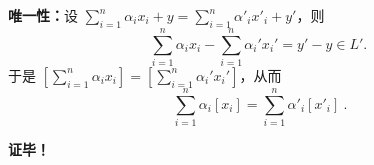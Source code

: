 \textbf{唯一性：}设 $\sum\limits_{i=1}^n\alpha_i x_i+y=\sum\limits_{i=1}^n\alpha'_i x'_i+y'$，则
\begin{equation}
\sum_{i=1}^n\alpha_i x_i-\sum_{i=1}^n\alpha_i'x_i'=y'-y\in L'.~
\end{equation}
于是 $[\sum_{i=1}^n\alpha_i x_i]=[\sum_{i=1}^n\alpha_i'x_i']$，从而
\begin{equation}
\sum_{i=1}^n \alpha_i[x_i]=\sum_{i=1}^n \alpha'_i[x'_i]~.
\end{equation}




\textbf{证毕！}

